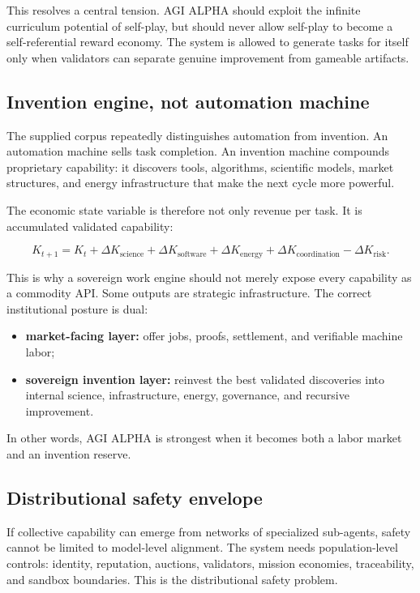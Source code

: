 \documentclass[11pt]{article}
\providecommand{\tightlist}{\setlength{\itemsep}{0pt}\setlength{\parskip}{0pt}}
\begin{document}
This resolves a central tension. AGI ALPHA should exploit the infinite curriculum potential of self-play, but should never allow self-play to become a self-referential reward economy. The system is allowed to generate tasks for itself only when validators can separate genuine improvement from gameable artifacts.

\subsection{Invention engine, not automation machine}\label{invention-engine-not-automation-machine}

The supplied corpus repeatedly distinguishes automation from invention. An automation machine sells task completion. An invention machine compounds proprietary capability: it discovers tools, algorithms, scientific models, market structures, and energy infrastructure that make the next cycle more powerful.

The economic state variable is therefore not only revenue per task. It is accumulated validated capability:

\[
K_{t+1}
=
K_t
+
\Delta K_{\text{science}}
+
\Delta K_{\text{software}}
+
\Delta K_{\text{energy}}
+
\Delta K_{\text{coordination}}
-
\Delta K_{\text{risk}}.
\]

This is why a sovereign work engine should not merely expose every capability as a commodity API. Some outputs are strategic infrastructure. The correct institutional posture is dual:

\begin{itemize}
\tightlist
\item
  \textbf{market-facing layer:} offer jobs, proofs, settlement, and verifiable machine labor;
\item
  \textbf{sovereign invention layer:} reinvest the best validated discoveries into internal science, infrastructure, energy, governance, and recursive improvement.
\end{itemize}

In other words, AGI ALPHA is strongest when it becomes both a labor market and an invention reserve.

\subsection{Distributional safety envelope}\label{distributional-safety-envelope}

If collective capability can emerge from networks of specialized sub-agents, safety cannot be limited to model-level alignment. The system needs population-level controls: identity, reputation, auctions, validators, mission economies, traceability, and sandbox boundaries. This is the distributional safety problem.
\end{document}
